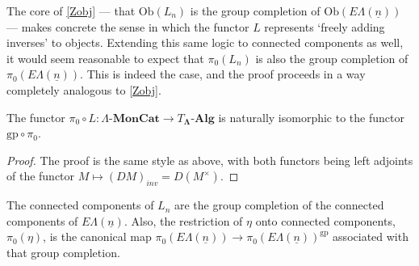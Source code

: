 \documentclass{amsbook} %
\newcommand{\mb}{\mathbf}
\newcommand{\ML}{\mathbf{\Lambda}}
\newcommand{\ELn}{E\Lambda(\underline{n})}
\newcommand{\lmc}{\Lambda\mbox{-}\mb{MonCat}}
\numberwithin{section}{chapter}
\begin{document}

The core of \cref{Zobj} --- that $\mathrm{Ob}(L_n)$ is the group completion of $\mathrm{Ob}(\ELn)$ --- makes concrete the sense in which the functor $L$ represents `freely adding inverses' to objects. Extending this same logic to connected components as well, it would seem reasonable to expect that $\pi_0(L_n)$ is also the group completion of $\pi_0(\ELn)$. This is indeed the case, and the proof proceeds in a way completely analogous to \cref{Zobj}. 



\begin{prop}\label{pilel_gppiel}
The functor $\pi_0 \circ L: \lmc \to T_{\ML}\mbox{-}\mb{Alg}$ is naturally isomorphic to the functor $\textrm{gp} \circ \pi_0$.
\end{prop}
\begin{proof}
The proof is the same style as above, with both functors being  left adjoints of the functor $M \mapsto (DM)_{inv} = D(M^{\times})$.
\end{proof}
\begin{cor}\label{Zconcomp} The connected components of $L_n$ are the group completion of the connected components of $\ELn$. Also, the restriction of $\eta$ onto connected components, $\pi_0(\eta)$, is the canonical map $\pi_0(\ELn) \to \pi_0(\ELn)^{\mathrm{gp}}$ associated with that group completion.
\end{cor}
\end{document}
